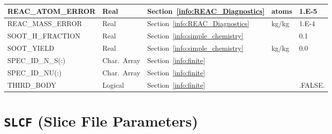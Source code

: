 \documentclass[11pt]{book}
\begin{document}
\begin{longtable}{@{\extracolsep{\fill}}|l|l|l|l|l|}
{\ct REAC\_ATOM\_ERROR}                   & Real        & Section~\ref{info:REAC_Diagnostics}       & atoms             & 1.E-5             \\ \hline
{\ct REAC\_MASS\_ERROR}                   & Real        & Section~\ref{info:REAC_Diagnostics}       & kg/kg             & 1.E-4             \\ \hline
{\ct SOOT\_H\_FRACTION}                   & Real        & Section~\ref{info:simple_chemistry}       &                   & 0.1               \\ \hline
{\ct SOOT\_YIELD}                         & Real        & Section~\ref{info:simple_chemistry}       & kg/kg             & 0.0               \\ \hline
{\ct SPEC\_ID\_N\_S(:)}                   & Char.~Array & Section~\ref{info:finite}                 &                   &                   \\ \hline
{\ct SPEC\_ID\_NU(:)}                     & Char.~Array & Section~\ref{info:finite}                 &                   &                   \\ \hline
{\ct THIRD\_BODY}                         & Logical     & Section~\ref{info:finite}                 &                   & {\ct .FALSE.}     \\ \hline
\end{longtable}

\vspace{\baselineskip}


\section{\texorpdfstring{{\tt SLCF}}{SLCF} (Slice File Parameters)}
\end{document}
